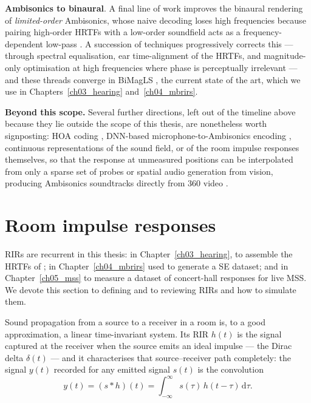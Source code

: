\vspace{0.8cm}

\textbf{Ambisonics to binaural}. A final line of work improves the binaural
rendering of \emph{limited-order} Ambisonics, whose naive decoding loses high
frequencies because pairing high-order \acrshort{HRTF}s with a low-order
soundfield acts as a frequency-dependent low-pass \citep{bernschutz2014binaural}.
A succession of techniques progressively corrects this --- through spectral
equalisation, ear time-alignment of the \acrshort{HRTF}s, and magnitude-only
optimisation at high frequencies where phase is perceptually irrelevant --- and
these threads converge in \acrfull{BiMagLS} \citep{engel2021improving}, the
current state of the art, which we use in Chapters~\ref{ch03_hearing}
and~\ref{ch04_mbrirs}.

\textbf{Beyond this scope.}
Several further directions, left out of the timeline above because they lie
outside the scope of this thesis, are nonetheless worth signposting: \acrshort{HOA} coding \citep{hold2023compression}, \acrshort{DNN}-based microphone-to-Ambisonics encoding \citep{heikkinen2025gen}, continuous representations of the sound
field, or of the room impulse responses themselves, so that the response at
unmeasured positions can be interpolated from only a sparse set of probes \citep{luo2022learning, masuyama2025physics, erdem2026sf, baek2025av} or spatial audio generation from vision, producing Ambisonics soundtracks directly from
360\textdegree{} video \citep{morgado2018self, liu2025omniaudio}. 

\section{Room impulse responses}
\label{sec:bg_rir}
\acrshort{RIR}s are recurrent in this thesis:
in Chapter~\ref{ch03_hearing}, to assemble the
\acrshort{HRTF}s of ; in Chapter~\ref{ch04_mbrirs} used to generate a \acrshort{SE} dataset; and in Chapter~\ref{ch05_mss} to measure a
dataset of concert-hall responses for live \acrshort{MSS}. We devote this section to defining and to reviewing \acrshort{RIR}s and how to simulate them.


Sound propagation from a source to a receiver in a room is, to a good
approximation, a linear time-invariant system. Its \acrfull{RIR} $h(t)$ is the
signal captured at the receiver when the source emits an ideal impulse ---
the Dirac delta $\delta(t)$ --- and it characterises that source--receiver
path completely: the signal $y(t)$ recorded for any emitted signal $s(t)$
is the convolution
\begin{equation}
    y(t) = (s * h)(t)
         = \int_{-\infty}^{\infty} s(\tau)\,h(t-\tau)\,\mathrm{d}\tau .
    \label{eq:rir_convolution}
\end{equation}

